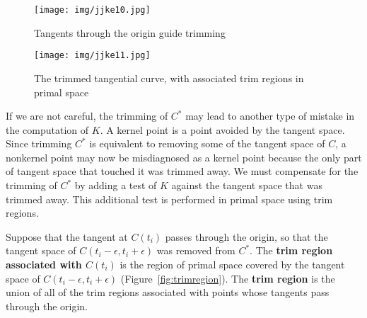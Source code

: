 \documentclass[12pt]{article}
\begin{document}
\begin{figure}[h]
\begin{center}
\texttt{[image: img/jjke10.jpg]}
\end{center}
\caption{Tangents through the origin guide trimming}
\label{fig:tangthruorig}
\end{figure}

\begin{figure}[h]
\begin{center}
\texttt{[image: img/jjke11.jpg]}
\end{center}
\caption{The trimmed tangential curve, with associated trim regions in primal space}
\label{fig:trim}
\end{figure}



If we are not careful,
the trimming of $C^*$ may lead to another type of mistake in the computation
of $K$.
A kernel point is a point avoided by the tangent space.
Since trimming $C^*$ is equivalent to removing some of the tangent
space of $C$,
a nonkernel point may now be misdiagnosed as a kernel point because the only
part of tangent space that touched it was trimmed away.
We must compensate for the trimming of $C^*$
by adding a test of $K$ against the tangent space that was trimmed away.
This additional test is performed in primal space using trim regions.


\begin{defn2}
Suppose that the tangent at $C(t_i)$ passes through the origin,
so that the tangent space of $C(t_i - \epsilon, t_i + \epsilon)$ was removed
from $C^*$.
The {\bf trim region associated with $C(t_i)$} 
is the region of primal space covered by the tangent space
of $C(t_i - \epsilon, t_i + \epsilon)$ (Figure~\ref{fig:trimregion}).
The {\bf trim region} is the union of all of the
trim regions associated with points whose tangents pass through the origin.
\end{defn2}
\end{document}
